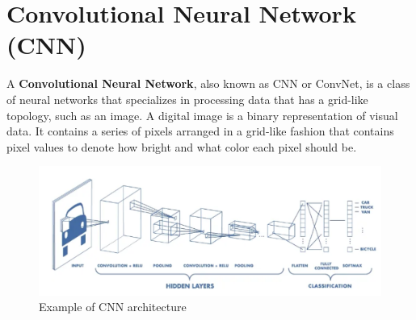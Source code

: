 \section{Convolutional Neural Network (CNN)}
A \textbf{Convolutional Neural Network}, also known as CNN or ConvNet, is a class of neural networks that specializes in processing data that has a grid-like topology, such as an image. A digital image is a binary representation of visual data. It contains a series of pixels arranged in a grid-like fashion that contains pixel values to denote how bright and what color each pixel should be. \cite{cnn}
\begin{figure}[hbtp]
\caption{Example of CNN architecture}
\centering
\includegraphics[scale=0.5]{../Images/cnnarch.png}
\end{figure}
